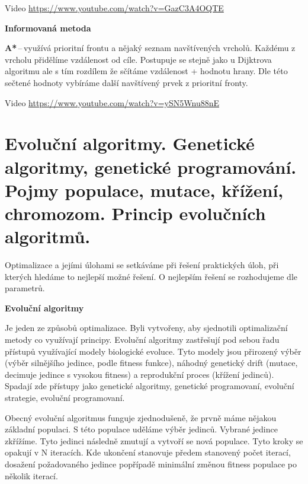 Video \url{https://www.youtube.com/watch?v=GazC3A4OQTE}


\begin{Large}\vspace{0,5cm} \textbf{Informovaná metoda}
\end{Large}

\textbf{A*}\,--\,využívá prioritní frontu a nějaký seznam navštívených vrcholů. Každému z vrcholu přidělíme vzdálenost od cíle. Postupuje se stejně jako u Dijktrova algoritmu ale s tím rozdílem že sčítáme vzdálenost + hodnotu hrany. Dle této sečtené hodnoty vybíráme další navštívený prvek z prioritní fronty.

Video \url{https://www.youtube.com/watch?v=ySN5Wnu88nE}







\newpage
\section{Evoluční algoritmy. Genetické algoritmy, genetické programování. Pojmy populace, mutace, křížení, chromozom. Princip evolučních algoritmů.}

Optimalizace a jejími úlohami se setkáváme při řešení praktických úloh, při kterých hledáme to nejlepší možné řešení. O nejlepším řešení se rozhodujeme dle parametrů.

\begin{Large}\vspace{0,5cm} \textbf{Evoluční algoritmy}
\end{Large}

Je jeden ze způsobů optimalizace. Byli vytvořeny, aby sjednotili optimalizační metody co využívají  principy. Evoluční algoritmy zastřešují pod sebou řadu přístupů využívající modely biologické evoluce. Tyto modely jsou přirozený výběr (výběr silnějšího jedince, podle fitness funkce), náhodný genetický drift (mutace, decimuje jedince s vysokou fitness) a reprodukční proces (křížení jedinců). Spadají zde přístupy jako genetické algoritmy, genetické programovaní, evoluční strategie, evoluční programovaní.

Obecný evoluční algoritmus funguje zjednodušeně, že prvně máme nějakou základní populaci. S této populace uděláme výběr jedinců. Vybrané jedince zkřížíme. Tyto jedinci následně zmutují a vytvoří se nová populace. Tyto kroky se opakují v N iteracích. Kde ukončení stanovuje předem stanovený počet iterací, dosažení požadovaného jedince popřípadě minimální změnou fitness populace po několik iterací.

